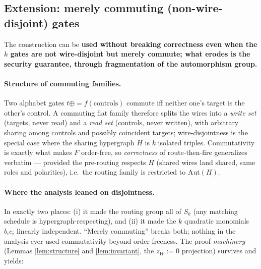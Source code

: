 \documentclass[11pt]{article}
\theoremstyle{remark}
\begin{document}
\subsection{Extension: merely commuting (non-wire-disjoint) gates}\label{sec:commuting}

The construction can be \textbf{used without breaking correctness even when the $k$ gates are
not wire-disjoint but merely commute; what erodes is the security guarantee, through
fragmentation of the automorphism group.}

\paragraph{Structure of commuting families.} Two alphabet gates
$t\mathrel{\oplus{=}}f(\text{controls})$ commute iff neither one's target is the other's
control. A commuting flat family therefore splits the wires into a \emph{write set} (targets,
never read) and a \emph{read set} (controls, never written), with arbitrary sharing among
controls and possibly coincident targets; wire-disjointness is the special case where the
sharing hypergraph $H$ is $k$ isolated triples. Commutativity is exactly what makes $F$
order-free, so \emph{correctness} of route-then-fire generalizes verbatim --- provided the
pre-routing respects $H$ (shared wires land shared, same roles and polarities), i.e.\ the
routing family is restricted to $\mathrm{Aut}(H)$.

\paragraph{Where the analysis leaned on disjointness.} In exactly two places: (i) it made the
routing group all of $S_k$ (any matching schedule is hypergraph-respecting), and (ii) it made
the $k$ quadratic monomials $b_ic_i$ linearly independent. ``Merely commuting'' breaks both;
nothing in the analysis ever used commutativity beyond order-freeness. The proof
\emph{machinery} (Lemmas \ref{lem:structure} and \ref{lem:invariant}, the $z_W{:=}0$
projection) survives and yields:
\end{document}
